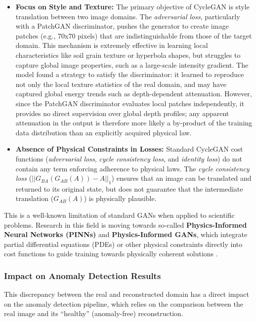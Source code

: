\begin{itemize}
    \item \textbf{Focus on Style and Texture:} The primary objective of CycleGAN is style translation between two image domains. The \textit{adversarial loss}, particularly with a PatchGAN discriminator, pushes the generator to create image patches (e.g., 70x70 pixels) that are indistinguishable from those of the target domain. This mechanism is extremely effective in learning local characteristics like soil grain texture or hyperbola shapes, but struggles to capture global image properties, such as a large-scale intensity gradient. The model found a strategy to satisfy the discriminator: it learned to reproduce not only the local texture statistics of the real domain, and may have captured global energy trends such as depth-dependent attenuation. However, since the PatchGAN discriminator evaluates local patches independently, it provides no direct supervision over global depth profiles; any apparent attenuation in the output is therefore more likely a by-product of the training data distribution than an explicitly acquired physical law.

    \item \textbf{Absence of Physical Constraints in Losses:} Standard CycleGAN cost functions (\textit{adversarial loss}, \textit{cycle consistency loss}, and \textit{identity loss}) do not contain any term enforcing adherence to physical laws. The \textit{cycle consistency loss} ($||G_{BA}(G_{AB}(A)) - A||_1$) ensures that an image can be translated and returned to its original state, but does not guarantee that the intermediate translation ($G_{AB}(A)$) is physically plausible.
\end{itemize}

This is a well-known limitation of standard GANs when applied to scientific problems.
Research in this field is moving towards so-called \textbf{Physics-Informed Neural Networks (PINNs)} and \textbf{Physics-Informed GANs}, which integrate partial differential equations (PDEs) or other physical constraints directly into cost functions to guide training towards physically coherent solutions \cite{raissi2019physics}.

\subsubsection{Impact on Anomaly Detection Results}

This discrepancy between the real and reconstructed domain has a direct impact on the anomaly detection pipeline, which relies on the comparison between the real image and its \enquote{healthy} (anomaly-free) reconstruction.

